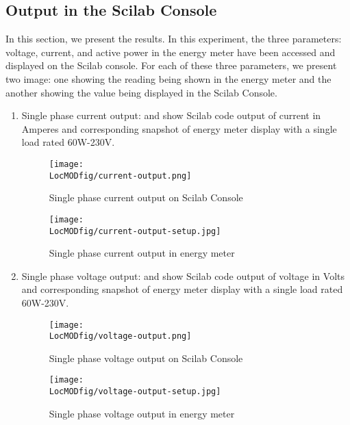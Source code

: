 \subsection{Output in the Scilab Console}
In this section, we present the results. In this experiment, the three parameters: voltage, current, and active power in the energy meter have been accessed and displayed on the Scilab console. For each of these three parameters, we present two image: one showing the reading being shown in the energy meter and the another showing the value being displayed in the Scilab Console. 
\begin{enumerate}
  \item Single phase current output:  and
         show Scilab code output of current in
        Amperes and corresponding snapshot of energy meter display with a
        single load rated 60W-230V.
        
        \begin{figure}
          \centering
          \texttt{[image: \\LocMODfig/current-output.png]}
          \caption{Single phase current output on Scilab Console}
          \label{fig:current-console}
        \end{figure}
        
        \begin{figure}
          \centering
          \texttt{[image: \\LocMODfig/current-output-setup.jpg]}
          \caption{Single phase current output in energy meter}
          \label{fig:current-meter}
        \end{figure}
        
  \item Single phase voltage output:  and
         show Scilab code output of voltage in
        Volts and corresponding snapshot of energy meter display with a
        single load rated 60W-230V.
        
        \begin{figure}
          \centering
          \texttt{[image: \\LocMODfig/voltage-output.png]}
          \caption{Single phase voltage output on Scilab Console}
          \label{fig:voltage-console}
        \end{figure}
        
        \begin{figure}
          \centering
          \texttt{[image: \\LocMODfig/voltage-output-setup.jpg]}
          \caption{Single phase voltage output in energy meter}
          \label{fig:voltage-meter}
        \end{figure}
        

\end{enumerate}
